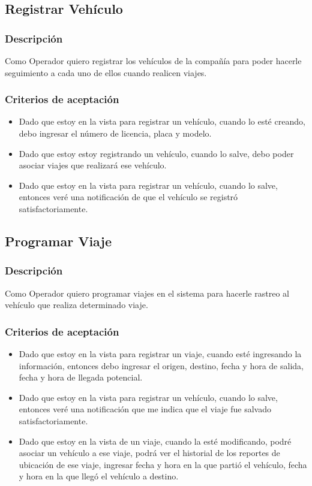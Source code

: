 \documentclass{article}
\begin{document}
\subsection{Registrar Vehículo}
\subsubsection{Descripción} 
Como Operador quiero registrar los vehículos de la compañía para poder hacerle seguimiento a cada uno de ellos cuando realicen viajes.
\subsubsection{Criterios de aceptación}
\begin{itemize}
    \item Dado que estoy en la vista para registrar un vehículo, cuando lo esté creando, debo ingresar el número de licencia, placa y modelo.
    \item Dado que estoy estoy registrando un vehículo, cuando lo salve, debo poder asociar viajes que realizará ese vehículo.
    \item Dado que estoy en la vista para registrar un vehículo, cuando lo salve, entonces veré una notificación de que el vehículo se registró satisfactoriamente.
\end{itemize}

\subsection{Programar Viaje}
\subsubsection{Descripción}
Como Operador quiero programar viajes en el sistema para hacerle rastreo al vehículo que realiza determinado viaje.
\subsubsection{Criterios de aceptación}
\begin{itemize}
    \item Dado que estoy en la vista para registrar un viaje, cuando esté ingresando la información, entonces debo ingresar el origen, destino, fecha y hora de salida, fecha y hora de llegada potencial.
    \item Dado que estoy en la vista para registrar un vehículo, cuando lo salve, entonces veré una notificación que me indica que el viaje fue salvado satisfactoriamente.
    \item Dado que estoy en la vista de un viaje, cuando la esté modificando, podré asociar un vehículo a ese viaje, podrá ver el historial de los reportes de ubicación de ese viaje, ingresar fecha y hora en la que partió el vehículo, fecha y hora en la que llegó el vehículo a destino.
\end{itemize}
\end{document}
